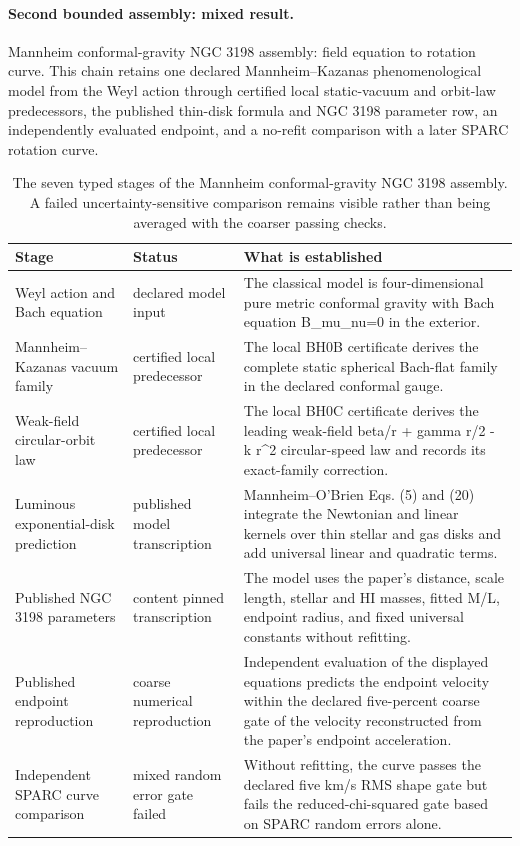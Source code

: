 \paragraph{Second bounded assembly: mixed result.}
Mannheim conformal-gravity NGC 3198 assembly: field equation to rotation curve.  This chain retains one declared Mannheim--Kazanas phenomenological model from the Weyl action through certified local static-vacuum and orbit-law predecessors, the published thin-disk formula and NGC 3198 parameter row, an independently evaluated endpoint, and a no-refit comparison with a later SPARC rotation curve.

\begin{table}[htbp]
\centering
\scriptsize
\begin{tabularx}{\textwidth}{@{}p{}p{}Y@{}}
\toprule
Stage & Status & What is established \\
\midrule
Weyl action and Bach equation & declared model input & The classical model is four-dimensional pure metric conformal gravity with Bach equation B\_mu\_nu=0 in the exterior. \\
Mannheim--Kazanas vacuum family & certified local predecessor & The local BH0B certificate derives the complete static spherical Bach-flat family in the declared conformal gauge. \\
Weak-field circular-orbit law & certified local predecessor & The local BH0C certificate derives the leading weak-field beta/r + gamma r/2 - k r\textasciicircum{}2 circular-speed law and records its exact-family correction. \\
Luminous exponential-disk prediction & published model transcription & Mannheim--O'Brien Eqs. (5) and (20) integrate the Newtonian and linear kernels over thin stellar and gas disks and add universal linear and quadratic terms. \\
Published NGC 3198 parameters & content pinned transcription & The model uses the paper's distance, scale length, stellar and HI masses, fitted M/L, endpoint radius, and fixed universal constants without refitting. \\
Published endpoint reproduction & coarse numerical reproduction & Independent evaluation of the displayed equations predicts the endpoint velocity within the declared five-percent coarse gate of the velocity reconstructed from the paper's endpoint acceleration. \\
Independent SPARC curve comparison & mixed random error gate failed & Without refitting, the curve passes the declared five km/s RMS shape gate but fails the reduced-chi-squared gate based on SPARC random errors alone. \\
\bottomrule
\end{tabularx}
\caption{The seven typed stages of the Mannheim conformal-gravity NGC 3198 assembly.  A failed uncertainty-sensitive comparison remains visible rather than being averaged with the coarser passing checks.}
\label{tab:mannheim-ngc3198-assembly}
\end{table}

